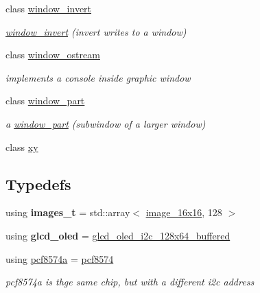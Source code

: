 \begin{DoxyCompactItemize}
class \hyperlink{classhwlib_1_1window__invert}{window\+\_\+invert}
\begin{DoxyCompactList}\small\item\em \hyperlink{classhwlib_1_1window__invert}{window\+\_\+invert} (invert writes to a window) \end{DoxyCompactList}\item 
class \hyperlink{classhwlib_1_1window__ostream}{window\+\_\+ostream}
\begin{DoxyCompactList}\small\item\em implements a console inside graphic window \end{DoxyCompactList}\item 
class \hyperlink{classhwlib_1_1window__part}{window\+\_\+part}
\begin{DoxyCompactList}\small\item\em a \hyperlink{classhwlib_1_1window__part}{window\+\_\+part} (subwindow of a larger window) \end{DoxyCompactList}\item 
class \hyperlink{classhwlib_1_1xy}{xy}
\end{DoxyCompactItemize}
\subsection*{Typedefs}
\begin{DoxyCompactItemize}
\item 
\mbox{\label{namespacehwlib_ad90ec7905770f55cdfde2b5532729e4b}} 
using {\bfseries images\+\_\+t} = std\+::array$<$ \hyperlink{classhwlib_1_1image__16x16}{image\+\_\+16x16}, 128 $>$
\item 
\mbox{\label{namespacehwlib_acfb754055c5d4981e94b750203dcca3a}} 
using {\bfseries glcd\+\_\+oled} = \hyperlink{classhwlib_1_1glcd__oled__i2c__128x64__buffered}{glcd\+\_\+oled\+\_\+i2c\+\_\+128x64\+\_\+buffered}
\item 
\mbox{\label{namespacehwlib_a1de5a49c6b1b8cd371e5444684018976}} 
using \hyperlink{namespacehwlib_a1de5a49c6b1b8cd371e5444684018976}{pcf8574a} = \hyperlink{classhwlib_1_1pcf8574}{pcf8574}
\begin{DoxyCompactList}\small\item\em pcf8574a is thge same chip, but with a different i2c address \end{DoxyCompactList}\end{DoxyCompactItemize}
